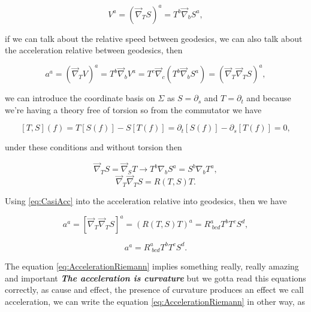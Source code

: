 \begin{equation}
    V^a=\left(\Vec{\nabla}_TS \right)^a = T^b\Vec{\nabla}_bS^a,
\end{equation}

if we can talk about the relative speed between geodesics, we can also talk about the acceleration relative between geodesics, then

\begin{equation}
    a^a = \left(\Vec{\nabla}_TV \right)^a = T^b\Vec{\nabla}_bV^a = T^c\Vec{\nabla}_c\left(T^b\Vec{\nabla}_bS^a \right) = \left(\Vec{\nabla}_T\Vec{\nabla}_TS\right)^a,
\end{equation}

we can introduce the coordinate basis on $\Sigma$ as $S = \partial_s$ and $T=\partial_t$  and because we're having a theory free of torsion so from the commutator we have

\begin{equation}
    \left[T,S \right](f) = T[S(f)] - S[T(f)] = \partial_t[S(f)] - \partial_s[T(f)]=0,
\end{equation}

under these conditions and without torsion then

\begin{equation}
    \Vec{\nabla}_TS=\Vec{\nabla}_ST\rightarrow T^b\nabla_bS^a=S^b\nabla_bT^a,
\end{equation}
\begin{equation}\label{eq:CasiAcc}
    \Vec{\nabla}_T\Vec{\nabla}_TS=R(T,S)T.
\end{equation}

Using \ref{eq:CasiAcc} into the acceleration relative into geodesics, then we have

\begin{equation}
    a^a = [\Vec{\nabla}_T\Vec{\nabla}_TS]^a = \left(R(T,S)T \right)^a = R^a_{\;bcd}T^bT^cS^d,
\end{equation}

\begin{equation}\label{eq:AccelerationRiemann}
    a^a = R^a_{\;bcd}T^bT^cS^d.
\end{equation}

The equation \ref{eq:AccelerationRiemann} implies something really, really amazing and important \textbf{\textit{The acceleration is curvature}} but we gotta read this equations correctly, as cause and effect, the presence of curvature produces an effect we call acceleration, we can write the equation \ref{eq:AccelerationRiemann} in other way, as

